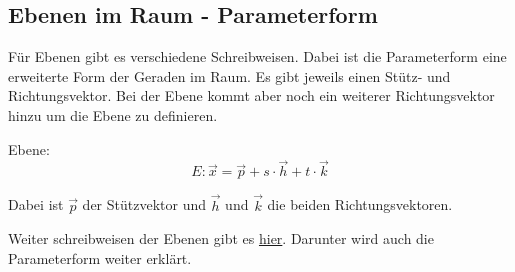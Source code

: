 \subsection{Ebenen im Raum - Parameterform}
Für Ebenen gibt es verschiedene Schreibweisen. 
Dabei ist die Parameterform eine erweiterte Form der Geraden im Raum.
Es gibt jeweils einen Stütz- und Richtungsvektor. 
Bei der Ebene kommt aber noch ein weiterer Richtungsvektor hinzu um die Ebene zu definieren.

Ebene: 
\[
E: \vec{x} = 
\vec{p} + s\cdot\vec{h} + t\cdot\vec{k}
\]

Dabei ist $\vec{p}$ der Stützvektor und $\vec{h}$ und $\vec{k}$ die beiden Richtungsvektoren.

Weiter schreibweisen der Ebenen gibt es \hyperref[sec:ebenen_formen]{hier}. 
Darunter wird auch die Parameterform weiter erklärt.

